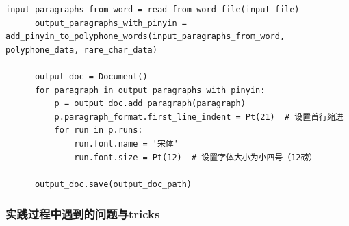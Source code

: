 \documentclass[12pt,hyperref,a4paper,UTF8]{ctexart}
\begin{document}
\begin{enumerate}
\begin{lstlisting}[caption={注音处理与文件保存实现代码}, label={lst:example}]
      input_paragraphs_from_word = read_from_word_file(input_file)
      output_paragraphs_with_pinyin = add_pinyin_to_polyphone_words(input_paragraphs_from_word, polyphone_data, rare_char_data)
  
      output_doc = Document()
      for paragraph in output_paragraphs_with_pinyin:
          p = output_doc.add_paragraph(paragraph)
          p.paragraph_format.first_line_indent = Pt(21)  # 设置首行缩进
          for run in p.runs:
              run.font.name = '宋体'
              run.font.size = Pt(12)  # 设置字体大小为小四号（12磅）
  
      output_doc.save(output_doc_path)
  \end{lstlisting}
\end{enumerate}
\subsubsection{实践过程中遇到的问题与tricks}
\end{document}
